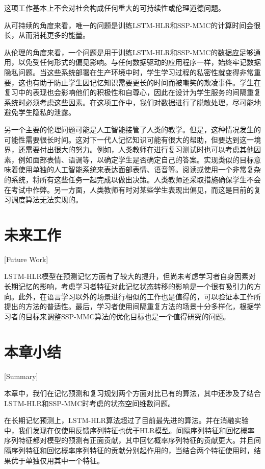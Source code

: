 这项工作基本上不会对社会构成任何重大的可持续性或伦理道德问题。

从可持续的角度来看，唯一的问题是训练LSTM-HLR和SSP-MMC的计算时间会很长，从而消耗更多的能量。

从伦理的角度来看，一个问题是用于训练LSTM-HLR和SSP-MMC的数据应足够通用，以免受任何形式的偏见影响。与任何数据驱动的应用程序一样，始终牢记数据隐私问题。当这些系统部署在生产环境中时，学生学习过程的私密性就变得非常重要，这也有助于防止学生因记忆知识需要更长的时间而被嘲笑的欺凌事件。学生在复习中的表现也会影响他们的积极性和自尊心，因此在设计为学生服务的间隔重复系统时必须考虑这些因素。在这项工作中，我们对数据进行了脱敏处理，尽可能地避免学生隐私的泄露。

另一个主要的伦理问题可能是人工智能接管了人类的教学。但是，这种情况发生的可能性需要很长时间。这对下一代人记忆知识可能有很大的帮助，但要达到这一境界，还需要付出很大的努力。例如，人类教师在进行复习测试时也可以考虑其他因素，例如面部表情、语调等，以确定学生是否确定自己的答案。实现类似的目标意味着使用单独的人工智能系统来表达面部表情、语音等。阅读或使用一个非常复杂的系统，将所有这些任务一起完成以做出决策。人类教师还采取措施确保学生不会在考试中作弊。另一方面，人类教师有时对某些学生表现出偏见，而这是目前的复习调度算法无法实现的。

\section{未来工作}[Future Work]

LSTM-HLR模型在预测记忆方面有了较大的提升，但尚未考虑学习者自身因素对长期记忆的影响，考虑学习者特征对此记忆状态转移的影响是一个很有吸引力的方向。此外，在语言学习以外的场景进行相似的工作也是值得的，可以验证本工作所提出的方法的普适性。最后，学习者使用间隔重复方法的场景十分多样化，根据学习者的目标来调整SSP-MMC算法的优化目标也是一个值得研究的问题。

\section{本章小结}[Summary]

本章中，我们在记忆预测和复习规划两个方面对比已有的算法，其中还涉及了结合LSTM-HLR和SSP-MMC时考虑的状态空间维数问题。

在长期记忆预测上，LSTM-HLR算法超过了目前最先进的算法。并在消融实验中，我们发现在仅使用反馈序列特征也优于HLR模型。间隔序列特征和回忆概率序列特征都对模型的预测有正面贡献，其中回忆概率序列特征的贡献更大。并且间隔序列特征和回忆概率序列特征的贡献分别起作用的，当结合两个特征使用时，结果优于单独仅用其中一个特征。

